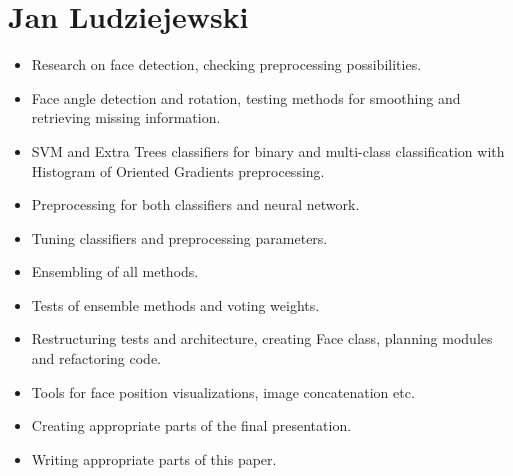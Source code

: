     \section{Jan Ludziejewski}
        \begin{itemize}
            \item Research on face detection, checking preprocessing possibilities.
            \item Face angle detection and rotation, testing methods for smoothing and retrieving missing information.
            \item SVM and Extra Trees classifiers for binary and multi-class
            classification with Histogram of Oriented Gradients preprocessing.
            \item Preprocessing for both classifiers and neural network.
            \item Tuning classifiers and preprocessing parameters.
            \item Ensembling of all methods.
            \item Tests of ensemble methods and voting weights.
            \item Restructuring tests and architecture, creating Face class, planning modules and refactoring code.
            \item Tools for face position visualizations, image concatenation etc.
            \item Creating appropriate parts of the final presentation.
            \item Writing appropriate parts of this paper.
        \end{itemize}

